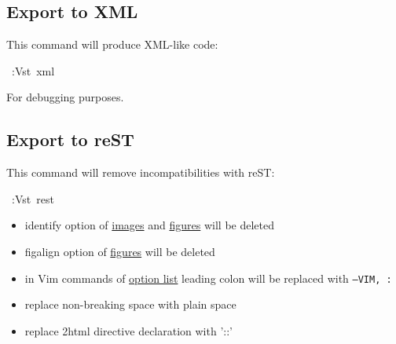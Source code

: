 \documentclass[12pt]{article}
\begin{document}
\subsection{Export to XML}

This command will produce XML-like code:

\begin{ttfamily}\begin{flushleft}
\mbox{~:Vst~xml}\\
\end{flushleft}\end{ttfamily}

For debugging purposes.

\hypertarget{lexport-to-rest}{}
\subsection{Export to reST}

This command will remove incompatibilities with reST:

\begin{ttfamily}\begin{flushleft}
\mbox{~:Vst~rest}\\
\end{flushleft}\end{ttfamily}

\begin{itemize}
\item
identify option of \href{\#limages}{images} and \href{\#lfigures}{figures} will be deleted

\item
figalign option of \href{\#lfigures}{figures} will be deleted

\item
in Vim commands of \href{\#loption-list}{option list} leading colon will be replaced with
\texttt{--VIM, :}

\item
replace non-breaking space with plain space

\item
replace 2html directive declaration with '::'
\end{itemize}
\begin{center}
\end{center}
\hypertarget{lauxiliary-commands}{}
\end{document}
